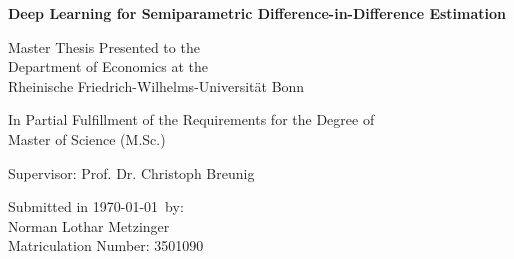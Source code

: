
\begin{titlepage}

\begin{center}

\vspace*{0.4cm}

\huge {\bfseries Deep Learning for Semiparametric Difference-in-Difference Estimation}

\vspace{1cm}

\large {Master Thesis Presented to the}\\
\large {Department of Economics at the}\\
\large {Rheinische Friedrich-Wilhelms-Universität Bonn}\\

\end{center}

\vspace{1cm}

\begin{center}


\large {In Partial Fulfillment of the Requirements for the Degree of}\\
\large {Master of Science (M.Sc.)}\\

\end{center}
\vspace{1cm}
\begin{center}

\vspace*{1cm}


\large {Supervisor: Prof. Dr. Christoph Breunig}\\

\end{center}

\vspace{1cm}

\begin{center}

\vfill


\large {Submitted in \today \, by:}\\
\large {Norman Lothar Metzinger}\\
\large {Matriculation Number: 3501090}\\

\end{center}

\vspace{1cm}



\setcounter{page}{0}\clearpage




\end{titlepage}

\endinput
